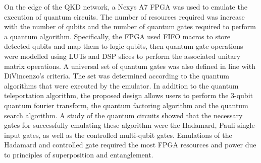 On the edge of the QKD network, a Nexys A7 FPGA was used to emulate the execution of quantum circuits. The number of resources required was increase with the number of qubits and the number of quantum gates required to perform a quantum algorithm. Specifically, the FPGA used FIFO macros to store detected qubits and map them to logic qubits, then quantum gate operations were modelled using LUTs and DSP slices to perform the associated unitary matrix operations. A universal set of quantum gates was also defined in line with DiVincenzo's criteria. The set was determined according to the quantum algorithms that were executed by the emulator. In addition to the quantum teleportation algorithm, the proposed design allows users to perform the 3-qubit quantum fourier transform, the quantum factoring algorithm and the quantum search algorithm. A study of the quantum circuits showed that the necessary gates for successfully emulating these algorithm were the Hadamard, Pauli single-input gates, as well as the controlled multi-qubit gates. Emulations of the Hadamard and controlled gate required the most FPGA resources and power due to principles of superposition and entanglement.
